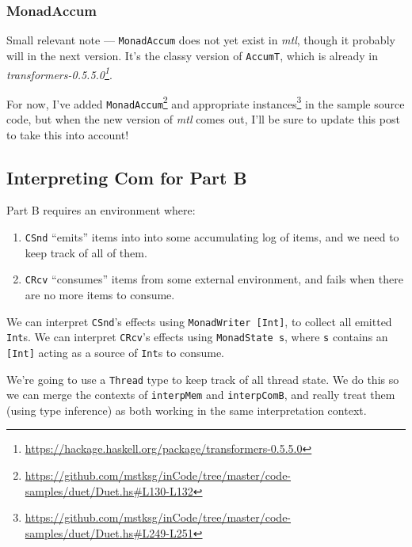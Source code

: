 \documentclass[]{article}
\renewcommand{\href}[2]{#2\footnote{\url{#1}}}
\begin{document}
\hypertarget{monadaccum}{%
\subsubsection{MonadAccum}\label{monadaccum}}

Small relevant note --- \texttt{MonadAccum} does not yet exist in \emph{mtl},
though it probably will in the next version. It's the classy version of
\texttt{AccumT}, which is already in
\emph{\href{https://hackage.haskell.org/package/transformers-0.5.5.0}{transformers-0.5.5.0}}.

For now,
\href{https://github.com/mstksg/inCode/tree/master/code-samples/duet/Duet.hs\#L130-L132}{I've
added \texttt{MonadAccum}} and
\href{https://github.com/mstksg/inCode/tree/master/code-samples/duet/Duet.hs\#L249-L251}{appropriate
instances} in the sample source code, but when the new version of \emph{mtl}
comes out, I'll be sure to update this post to take this into account!

\hypertarget{interpreting-com-for-part-b}{%
\subsection{Interpreting Com for Part B}\label{interpreting-com-for-part-b}}

Part B requires an environment where:

\begin{enumerate}
\def\labelenumi{\arabic{enumi}.}
\tightlist
\item
  \texttt{CSnd} ``emits'' items into into some accumulating log of items, and we
  need to keep track of all of them.
\item
  \texttt{CRcv} ``consumes'' items from some external environment, and fails
  when there are no more items to consume.
\end{enumerate}

We can interpret \texttt{CSnd}'s effects using \texttt{MonadWriter\ {[}Int{]}},
to collect all emitted \texttt{Int}s. We can interpret \texttt{CRcv}'s effects
using \texttt{MonadState\ s}, where \texttt{s} contains an \texttt{{[}Int{]}}
acting as a source of \texttt{Int}s to consume.

We're going to use a \texttt{Thread} type to keep track of all thread state. We
do this so we can merge the contexts of \texttt{interpMem} and
\texttt{interpComB}, and really treat them (using type inference) as both
working in the same interpretation context.
\end{document}
